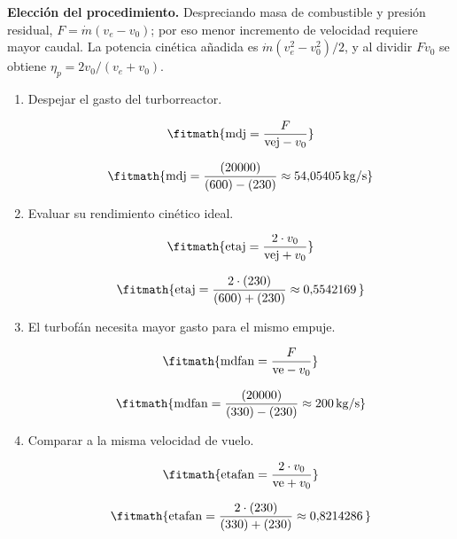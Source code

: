 \noindent\textbf{Elección del procedimiento.} Despreciando masa de combustible y presión residual, $F=\dot m(v_e-v_0)$; por eso menor incremento de velocidad requiere mayor caudal. La potencia cinética añadida es $\dot m(v_e^2-v_0^2)/2$, y al dividir $Fv_0$ se obtiene $\eta_p=2v_0/(v_e+v_0)$.

\begin{enumerate}

\item Despejar el gasto del turborreactor.

\[\fitmath{\mathrm{mdj}=\frac{F}{\mathrm{vej}-v_{0}}}\]

\[\fitmath{\mathrm{mdj}=\frac{(20000)}{(600)-(230)}\approx 54{,}05405\,\mathrm{kg/s}}\]

\item Evaluar su rendimiento cinético ideal.

\[\fitmath{\mathrm{etaj}=\frac{2\cdot v_{0}}{\mathrm{vej}+v_{0}}}\]

\[\fitmath{\mathrm{etaj}=\frac{2\cdot (230)}{(600)+(230)}\approx 0{,}5542169\,}\]

\item El turbofán necesita mayor gasto para el mismo empuje.

\[\fitmath{\mathrm{mdfan}=\frac{F}{\mathrm{ve}-v_{0}}}\]

\[\fitmath{\mathrm{mdfan}=\frac{(20000)}{(330)-(230)}\approx 200\,\mathrm{kg/s}}\]

\item Comparar a la misma velocidad de vuelo.

\[\fitmath{\mathrm{etafan}=\frac{2\cdot v_{0}}{\mathrm{ve}+v_{0}}}\]

\[\fitmath{\mathrm{etafan}=\frac{2\cdot (230)}{(330)+(230)}\approx 0{,}8214286\,}\]

\end{enumerate}
